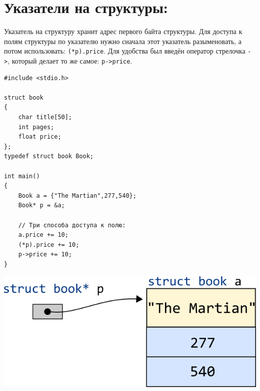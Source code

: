 \documentclass{article}
\begin{document}
\section*{Указатели на структуры:}
Указатель на структуру хранит адрес первого байта структуры. Для доступа к полям структуры по указателю нужно сначала этот указатель разыменовать, а потом использовать: \texttt{(*p).price}. Для удобства был введён оператор стрелочка \texttt{->}, который делает то же самое: \texttt{p->price}.
\begin{multicols}{2}
\begin{lstlisting}
#include <stdio.h>

struct book 
{
    char title[50];
    int pages;
    float price;
};
typedef struct book Book;

int main() 
{
    Book a = {"The Martian",277,540};
    Book* p = &a;
    
    // Три способа доступа к полю:
    a.price += 10;
    (*p).price += 10;
    p->price += 10;
}
\end{lstlisting}
\vfill\null
\columnbreak
\vspace*{3\baselineskip}
\begin{center}
\includegraphics[scale=0.5]{../images/structpointer2.png}
\end{center}
\end{multicols}
\end{document}
